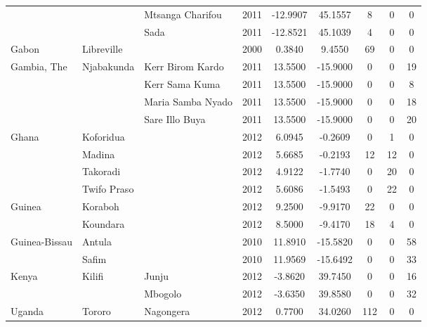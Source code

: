 \begin{tabular}{lllcccccc}
 &  & Mtsanga Charifou & 2011 & -12.9907 & 45.1557 & 8 & 0 & 0 \\

 &  & Sada & 2011 & -12.8521 & 45.1039 & 4 & 0 & 0 \\

Gabon & Libreville &  & 2000 & 0.3840 & 9.4550 & 69 & 0 & 0 \\

Gambia, The & Njabakunda & Kerr Birom Kardo & 2011 & 13.5500 & -15.9000 & 0 & 0 & 19 \\

 &  & Kerr Sama Kuma & 2011 & 13.5500 & -15.9000 & 0 & 0 & 8 \\

 &  & Maria Samba Nyado & 2011 & 13.5500 & -15.9000 & 0 & 0 & 18 \\

 &  & Sare Illo Buya & 2011 & 13.5500 & -15.9000 & 0 & 0 & 20 \\

Ghana & Koforidua &  & 2012 & 6.0945 & -0.2609 & 0 & 1 & 0 \\

 & Madina &  & 2012 & 5.6685 & -0.2193 & 12 & 12 & 0 \\

 & Takoradi &  & 2012 & 4.9122 & -1.7740 & 0 & 20 & 0 \\

 & Twifo Praso &  & 2012 & 5.6086 & -1.5493 & 0 & 22 & 0 \\

Guinea & Koraboh &  & 2012 & 9.2500 & -9.9170 & 22 & 0 & 0 \\

 & Koundara &  & 2012 & 8.5000 & -9.4170 & 18 & 4 & 0 \\

Guinea-Bissau & Antula &  & 2010 & 11.8910 & -15.5820 & 0 & 0 & 58 \\

 & Safim &  & 2010 & 11.9569 & -15.6492 & 0 & 0 & 33 \\

Kenya & Kilifi & Junju & 2012 & -3.8620 & 39.7450 & 0 & 0 & 16 \\

 &  & Mbogolo & 2012 & -3.6350 & 39.8580 & 0 & 0 & 32 \\

Uganda & Tororo & Nagongera & 2012 & 0.7700 & 34.0260 & 112 & 0 & 0 \\

\bottomrule
\end{tabular}
